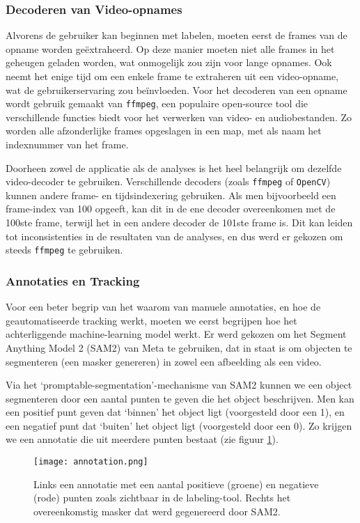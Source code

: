 \subsubsection{Decoderen van Video-opnames}

Alvorens de gebruiker kan beginnen met labelen, moeten eerst de frames van de opname worden geëxtraheerd.
Op deze manier moeten niet alle frames in het geheugen geladen worden, wat onmogelijk zou zijn voor lange opnames.
Ook neemt het enige tijd om een enkele frame te extraheren uit een video-opname, wat de gebruikerservaring zou beïnvloeden.
Voor het decoderen van een opname wordt gebruik gemaakt van \texttt{ffmpeg}, een populaire open-source tool die verschillende 
functies biedt voor het verwerken van video- en audiobestanden.
Zo worden alle afzonderlijke frames opgeslagen in een map, met als naam het indexnummer van het frame.

Doorheen zowel de applicatie als de analyses is het heel belangrijk om dezelfde video-decoder te gebruiken.
Verschillende decoders (zoals \texttt{ffmpeg} of \texttt{OpenCV}) kunnen andere frame- en tijdsindexering gebruiken.
Als men bijvoorbeeld een frame-index van 100 opgeeft, kan dit in de ene decoder overeenkomen met de 100ste frame, terwijl het in een andere decoder de 101ste frame is.
Dit kan leiden tot inconsistenties in de resultaten van de analyses, en dus werd er gekozen om steeds \texttt{ffmpeg} te gebruiken.

\subsubsection{Annotaties en Tracking}

Voor een beter begrip van het waarom van manuele annotaties, en hoe de geautomatiseerde tracking werkt, moeten we eerst begrijpen hoe het achterliggende machine-learning model werkt.
Er werd gekozen om het Segment Anything Model 2 (SAM2) van Meta te gebruiken, dat in staat is om objecten te segmenteren (een masker genereren) in zowel een afbeelding als een video.

Via het `promptable-segmentation'-mechanisme van SAM2 kunnen we een object segmenteren door een aantal punten te geven die het object beschrijven.
Men kan een positief punt geven dat `binnen' het object ligt (voorgesteld door een 1), en een negatief punt dat `buiten' het object ligt (voorgesteld door een 0).
Zo krijgen we een annotatie die uit meerdere punten bestaat (zie figuur \ref{fig:annotation}).

\begin{figure}[H]
  \centering
  \texttt{[image: annotation.png]}
  \caption[]{\label{fig:annotation} Links een annotatie met een aantal positieve (groene) en negatieve (rode) punten zoals zichtbaar in de labeling-tool. Rechts het overeenkomstig masker dat werd gegenereerd door SAM2. }
\end{figure}

